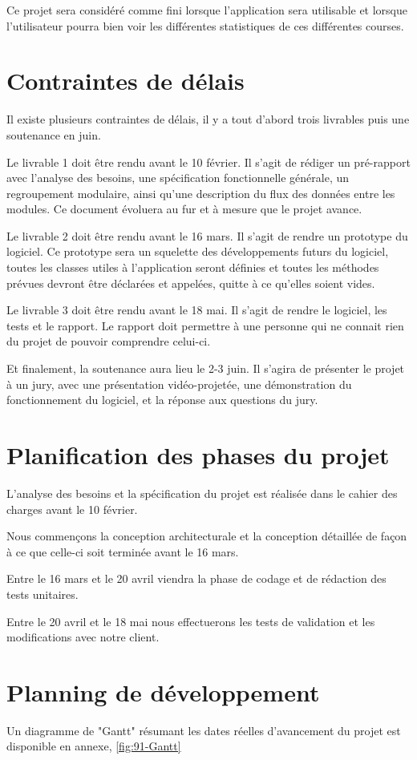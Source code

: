 Ce projet sera considéré comme fini lorsque l’application sera utilisable et lorsque l’utilisateur pourra bien voir les différentes statistiques de ces différentes courses.

\section{Contraintes de délais}

Il existe plusieurs contraintes de délais, il y a tout d'abord trois livrables puis une soutenance en juin.

Le livrable 1 doit être rendu avant le 10 février. Il s'agit de rédiger un pré-rapport avec l'analyse des besoins, une spécification fonctionnelle générale, un regroupement modulaire, ainsi qu'une description du flux des données entre les modules. Ce document évoluera au fur et à mesure que le projet avance.

Le livrable 2 doit être rendu avant le 16 mars. Il s'agit de rendre un prototype du logiciel. Ce prototype sera un squelette des développements futurs du logiciel, toutes les classes utiles à l'application seront définies et toutes les méthodes prévues devront être déclarées et appelées, quitte à ce qu'elles soient vides.

Le livrable 3 doit être rendu avant le 18 mai. Il s'agit de rendre le logiciel, les tests et le rapport. Le rapport doit permettre à une personne qui ne connait rien du projet de pouvoir comprendre celui-ci.

Et finalement, la soutenance aura lieu le 2-3 juin. Il s'agira de présenter le projet à un jury, avec une présentation vidéo-projetée, une démonstration du fonctionnement du logiciel, et la réponse aux questions du jury.

\section{Planification des phases du projet}

L'analyse des besoins et la spécification du projet est réalisée dans le cahier des charges avant le 10 février.

Nous commençons la conception architecturale et la conception détaillée de façon à ce que celle-ci soit terminée avant le 16 mars.

Entre le 16 mars et le 20 avril viendra la phase de codage et de rédaction des tests unitaires.

Entre le 20 avril et le 18 mai nous effectuerons les tests de validation et les modifications avec notre client.


\section{Planning de développement}

Un diagramme de "Gantt" résumant les dates réelles d'avancement du projet est disponible en annexe, \autoref{fig:91-Gantt}